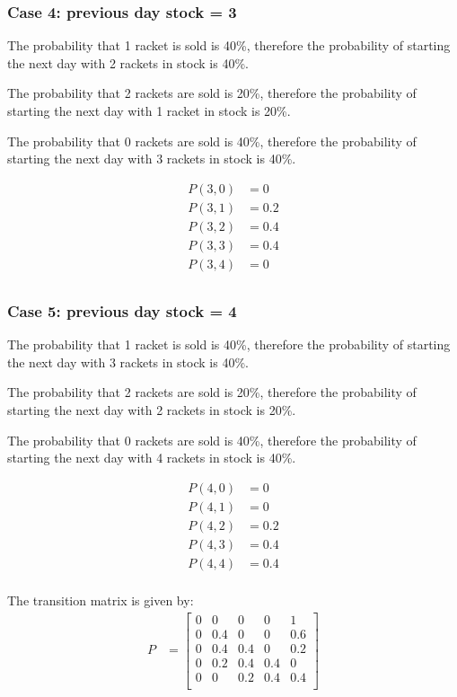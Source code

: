 \documentclass[12pt]{article}
\begin{document}
\begin{enumerate}
\begin{enumerate}
\subsubsection*{Case 4: previous day stock = 3}

The probability that 1 racket is sold is 40\%, therefore the probability of starting the next day with 2 rackets in stock is 40\%. 

The probability that 2 rackets are sold is 20\%, therefore the probability of starting the next day with 1 racket in stock is 20\%. 

The probability that 0 rackets are sold is 40\%, therefore the probability of starting the next day with 3 rackets in stock is 40\%.

\begin{align*}
P(3, 0) &= 0 \\
P(3, 1) &= 0.2 \\
P(3, 2) &= 0.4 \\
P(3, 3) &= 0.4 \\
P(3, 4) &= 0 \\
\end{align*}

\subsubsection*{Case 5: previous day stock = 4}
The probability that 1 racket is sold is 40\%, therefore the probability of starting the next day with 3 rackets in stock is 40\%.

The probability that 2 rackets are sold is 20\%, therefore the probability of starting the next day with 2 rackets in stock is 20\%.

The probability that 0 rackets are sold is 40\%, therefore the probability of starting the next day with 4 rackets in stock is 40\%.

\begin{align*}
P(4, 0) &= 0 \\
P(4, 1) &= 0 \\
P(4, 2) &= 0.2 \\
P(4, 3) &= 0.4 \\
P(4, 4) &= 0.4 \\
\end{align*}

The transition matrix is given by:
\begin{align*}
P &= \begin{bmatrix}
0 & 0 & 0 & 0 & 1 \\
0 & 0.4 & 0 & 0 & 0.6 \\
0 & 0.4 & 0.4 & 0 & 0.2 \\
0 & 0.2 & 0.4 & 0.4 & 0 \\
0 & 0 & 0.2 & 0.4 & 0.4 \\
\end{bmatrix}
\end{align*}
%


\end{enumerate}
\end{enumerate}
\end{document}

